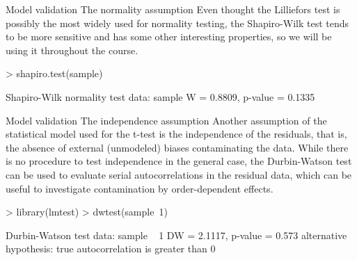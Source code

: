 \documentclass[t]{beamer}
\begin{document}

\begin{ftstf}
{Model validation}
{The normality assumption}
Even thought the Lilliefors test is possibly the most widely used for normality testing, the Shapiro-Wilk test tends to be more sensitive and has some other  interesting properties, so we will be using it throughout the course.
\vhalf
\begin{rcode}
> shapiro.test(sample)

Shapiro-Wilk normality test
data:  sample
W = 0.8809, p-value = 0.1335
\end{rcode}
\end{ftstf}


\begin{ftstf}
{Model validation}
{The independence assumption}
Another assumption of the statistical model used for the t-test is the independence of the residuals, that is, the absence of external (unmodeled) biases contaminating the data.
\vhalf
While there is no procedure to test independence in the general case, the Durbin-Watson test can be used to evaluate serial autocorrelations in the residual data, which can be useful to investigate contamination by order-dependent effects.
\begin{rcode}
> library(lmtest)
> dwtest(sample~1)

Durbin-Watson test
data:  sample ~ 1
DW = 2.1117, p-value = 0.573
alternative hypothesis: true autocorrelation is greater than 0
\end{rcode}
\end{ftstf}
\end{document}
